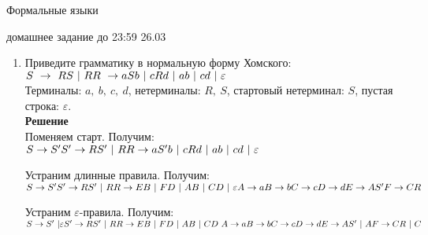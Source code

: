 \documentclass[12pt]{article}
\begin{document}
\begin{center} {\LARGE Формальные языки} \end{center}

\begin{center} \Large домашнее задание до 23:59 26.03 \end{center}
\bigskip

\begin{enumerate}
  \item [\bf \textnumero 2] Приведите грамматику в нормальную форму Хомского: \\
  $S\ \to\ RS\ |\ R\\
   R\ \to aSb\ |\ cRd\ |\ ab\ |\ cd\ |\ \varepsilon$\\
   Терминалы: $a,\ b,\ c,\ d$, нетерминалы: $R,\ S$, стартовый нетерминал: $S$, пустая строка: $\varepsilon$.\\
   {\bf Решение}\\
   Поменяем старт. Получим:\\
   $S \to S'\\
   S' \to RS'\ |\ R\\
   R \to aS'b\ |\ cRd\ |\ ab\ |\ cd\ |\ \varepsilon$
   
   Устраним длинные правила. Получим:\\
   $S \to S'\\
   S' \to RS'\ |\ R\\
   R \to EB\ |\ FD\ |\ AB\ |\ CD\ |\ \varepsilon\\
   A \to a\\
   B \to b\\
   C \to c\\
   D \to d\\
   E \to AS'\\
   F \to CR$
   
   Устраним $\varepsilon$-правила. Получим:\\
   $S \to S'\ | \varepsilon\\
   S' \to RS'\ |\ R\\
   R \to EB\ |\ FD\ |\ AB\ |\ CD\\\
   A \to a\\
   B \to b\\
   C \to c\\
   D \to d\\
   E \to AS'\ |\ A \\
   F \to CR\ |\ C$
   

\end{enumerate}
\end{document}
